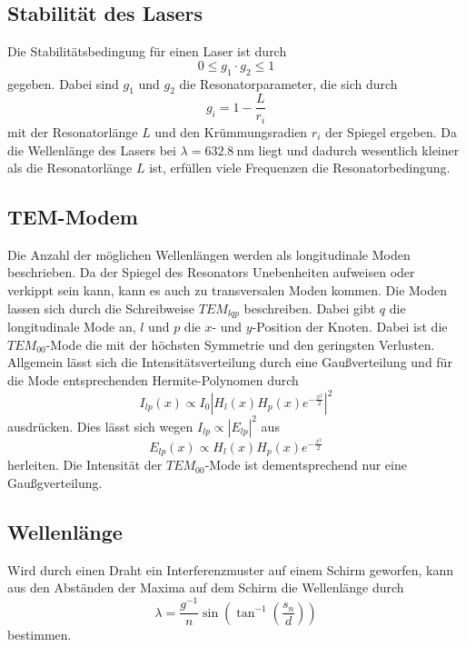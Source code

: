 \subsection{Stabilität des Lasers}
\label{sec:Stabilitaet}
Die Stabilitätsbedingung für einen Laser ist durch
\begin{equation}
    \label{eq:stabil}
    0 \leq g_1 \cdot g_2 \leq 1
\end{equation}
gegeben. Dabei sind $g_1$ und $g_2$ die Resonatorparameter, die sich durch
\begin{equation}
    \label{eq:param}
    g_i = 1 - \frac{L}{r_i}
\end{equation}
mit der Resonatorlänge $L$ und den Krümmungsradien $r_i$ der Spiegel ergeben. Da die Wellenlänge des Lasers
bei $\lambda = \SI{632,8}{\nano\meter}$ liegt und dadurch wesentlich kleiner als die Resonatorlänge $L$ ist,
erfüllen viele Frequenzen die Resonatorbedingung.

\subsection{TEM-Modem}
\label{sec:Moden}
Die Anzahl der möglichen Wellenlängen werden als longitudinale Moden beschrieben. Da der Spiegel des Resonators
Unebenheiten aufweisen oder verkippt sein kann, kann es auch zu transversalen Moden kommen. Die Moden lassen sich
durch die Schreibweise $TEM_{lqp}$ beschreiben. Dabei gibt $q$ die longitudinale Mode an, $l$ und $p$ die $x$-
und $y$-Position der Knoten. Dabei ist die $TEM_{00}$-Mode die mit der höchsten Symmetrie und den geringsten
Verlusten. Allgemein lässt sich die Intensitätsverteilung durch eine Gaußverteilung und für die Mode entsprechenden
Hermite-Polynomen durch
\begin{equation}
    I_{lp}(x) \propto I_0 |H_{l}(x)H_{p}(x)e^{-\frac{x^2}{2}}|^2
\end{equation}
ausdrücken. Dies lässt sich wegen $I_{lp} \propto |E_{lp}|^2$ aus
\begin{equation}
    E_{lp}(x) \propto H_{l}(x)H_{p}(x)e^{-\frac{x^2}{2}}
\end{equation}
herleiten. Die Intensität der $TEM_{00}$-Mode ist dementsprechend nur eine Gaußgverteilung.

\subsection{Wellenlänge}
\label{sec:Wellenlaenge}
Wird durch einen Draht ein Interferenzmuster auf einem Schirm geworfen, kann aus den Abständen der Maxima auf dem
Schirm die Wellenlänge durch
\begin{equation}
    \label{eq:winkel}
    \lambda = \frac{g^{-1}}{n} \sin\left(\tan^{-1}\left(\frac{s_n}{d}\right)\right)
\end{equation}
bestimmen.